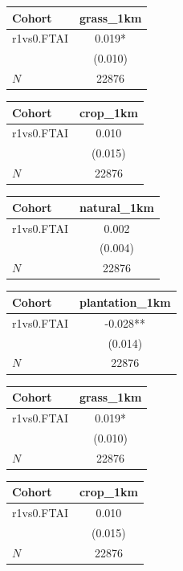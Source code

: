 {
\def\sym#1{\ifmmode^{#1}\else\(^{#1}\)\fi}
\begin{tabular}{l*{1}{c}}
\toprule
Cohort    &grass\_1km   \\
\midrule
r1vs0.FTAI&    0.019*  \\
          &  (0.010)   \\
\midrule
\(N\)     &    22876   \\
\bottomrule
\end{tabular}
}
{
\def\sym#1{\ifmmode^{#1}\else\(^{#1}\)\fi}
\begin{tabular}{l*{1}{c}}
\toprule
Cohort    & crop\_1km   \\
\midrule
r1vs0.FTAI&    0.010   \\
          &  (0.015)   \\
\midrule
\(N\)     &    22876   \\
\bottomrule
\end{tabular}
}
{
\def\sym#1{\ifmmode^{#1}\else\(^{#1}\)\fi}
\begin{tabular}{l*{1}{c}}
\toprule
Cohort    &natural\_1km   \\
\midrule
r1vs0.FTAI&    0.002   \\
          &  (0.004)   \\
\midrule
\(N\)     &    22876   \\
\bottomrule
\end{tabular}
}
{
\def\sym#1{\ifmmode^{#1}\else\(^{#1}\)\fi}
\begin{tabular}{l*{1}{c}}
\toprule
Cohort    &plantation\_1km   \\
\midrule
r1vs0.FTAI&   -0.028** \\
          &  (0.014)   \\
\midrule
\(N\)     &    22876   \\
\bottomrule
\end{tabular}
}
{
\def\sym#1{\ifmmode^{#1}\else\(^{#1}\)\fi}
\begin{tabular}{l*{1}{c}}
\toprule
Cohort    &grass\_1km   \\
\midrule
r1vs0.FTAI&    0.019*  \\
          &  (0.010)   \\
\midrule
\(N\)     &    22876   \\
\bottomrule
\end{tabular}
}
{
\def\sym#1{\ifmmode^{#1}\else\(^{#1}\)\fi}
\begin{tabular}{l*{1}{c}}
\toprule
Cohort    & crop\_1km   \\
\midrule
r1vs0.FTAI&    0.010   \\
          &  (0.015)   \\
\midrule
\(N\)     &    22876   \\
\bottomrule
\end{tabular}
}
